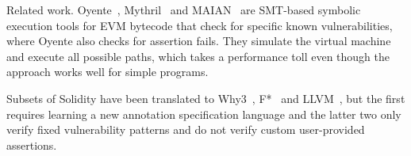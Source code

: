 \begin{paragraph}{Related work.}
Oyente~\cite{Luu2016}, Mythril~\cite{Mythril} and MAIAN~\cite{NKSSH18} are SMT-based symbolic
execution tools for EVM bytecode that check for specific known vulnerabilities,
where Oyente also checks for assertion fails. They simulate the virtual
machine and execute all possible paths, which takes a performance toll even
though the approach works well for simple programs.

Subsets of Solidity have been translated to Why3~\cite{Why3},
F*~\cite{Bhargavan2016} and LLVM~\cite{ZEUS}, but the first requires learning a new annotation
specification language and the latter two only verify fixed vulnerability
patterns and do not verify custom user-provided assertions.

\end{paragraph}
